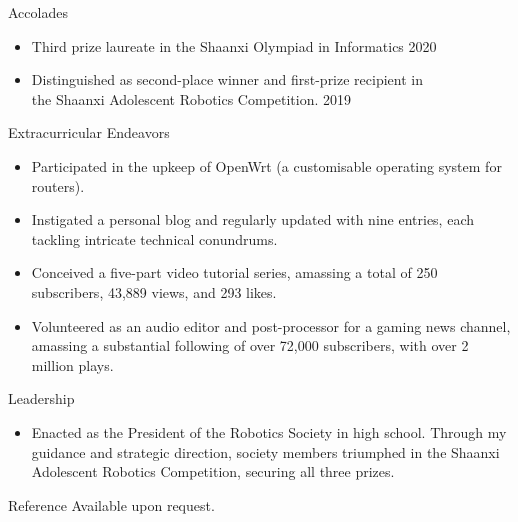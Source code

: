 \documentclass{resume} %
\begin{document}
\begin{rSection}{Accolades} 
\begin{itemize}
    \item Third prize laureate in the Shaanxi Olympiad in Informatics \hfill 2020
    \item Distinguished as second-place winner and first-prize recipient in \\
    the Shaanxi Adolescent Robotics Competition. \hfill 2019
\end{itemize}
\end{rSection}
\begin{rSection}{Extracurricular Endeavors} 
\begin{itemize}
    \item 	Participated in the upkeep of OpenWrt (a customisable operating system for routers).
    \item	Instigated a personal blog and regularly updated with nine entries, each tackling intricate technical conundrums.
    \item   Conceived a five-part video tutorial series, amassing a total of 250 subscribers, 43,889 views, and 293 likes.
    \item   Volunteered as an audio editor and post-processor for a gaming news channel, amassing a substantial following of over 72,000 subscribers, with over 2 million plays.
\end{itemize}
\end{rSection}

\begin{rSection}{Leadership} 
\begin{itemize}
    \item Enacted as the President of the Robotics Society in high school. 
    Through my guidance and strategic direction, society members triumphed in 
    the Shaanxi Adolescent Robotics Competition, securing all three prizes.
\end{itemize}
\end{rSection}

\begin{rSection}{Reference} 
    Available upon request.
\end{rSection}
\end{document}
